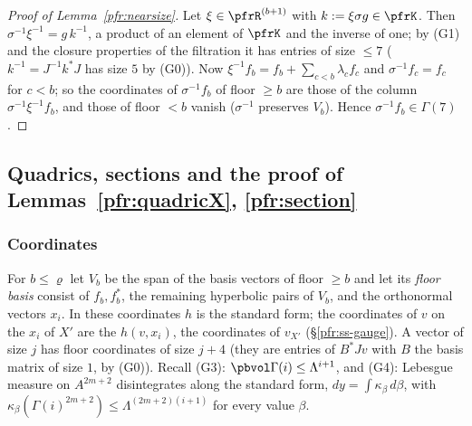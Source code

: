 \documentclass[10pt]{amsart}
\theoremstyle{definition}
\theoremstyle{remark}
\begin{document}
\begin{proof}[Proof of Lemma~\ref{pfr:nearsize}]
Let $\xi\in\pfrR^{(b+1)}$ with $k:=\xi\sigma g\in\pfrK$. Then $\sigma^{-1}\xi^{-1}=g\,k^{-1}$, a product of an element of
$\pfrK$ and the inverse of one; by (G1) and the closure properties of the filtration it has entries of
size $\le7$ ($k^{-1}=J^{-1}k^*J$ has size $5$ by (G0)).
Now $\xi^{-1}f_b=f_b+\sum_{c<b}\lambda_cf_c$ and $\sigma^{-1}f_c=f_c$ for $c<b$; so the coordinates of
$\sigma^{-1}f_b$ of floor $\ge b$ are those of the column $\sigma^{-1}\xi^{-1}f_b$, and those of floor $<b$ vanish
($\sigma^{-1}$ preserves $V_b$). Hence $\sigma^{-1}f_b\in\Gamma(7)$.
\end{proof}

\subsection{Quadrics, sections and the proof of Lemmas~\ref{pfr:quadricX}, \ref{pfr:section}}\label{pfr:ss-section}

\subsubsection*{Coordinates}
For $b\le\varrho$ let $V_b$ be the span of the basis vectors of floor $\ge b$ and let its \emph{floor basis}
consist of $f_b,f_b^*$, the remaining hyperbolic pairs of $V_b$, and the orthonormal vectors $x_i$. In
these coordinates $h$ is the standard form; the coordinates of $v$ on the $x_i$ of $X'$ are the $h(v,x_i)$, the
coordinates of $v_{X'}$ (\S\ref{pfr:ss-gauge}). A vector of size $j$ has floor coordinates of size $j+4$ (they are entries of
$B^*Jv$ with $B$ the basis matrix of size $1$, by (G0)). Recall (G3): $\pbvol\Gamma(i)\le\Lambda^{i+1}$, and
(G4): Lebesgue measure on $A^{2m+2}$ disintegrates along the standard form, $dy=\int\kappa_\beta\,d\beta$,
with $\kappa_\beta(\Gamma(i)^{2m+2})\le\Lambda^{(2m+2)(i+1)}$ for every value $\beta$.
\end{document}
